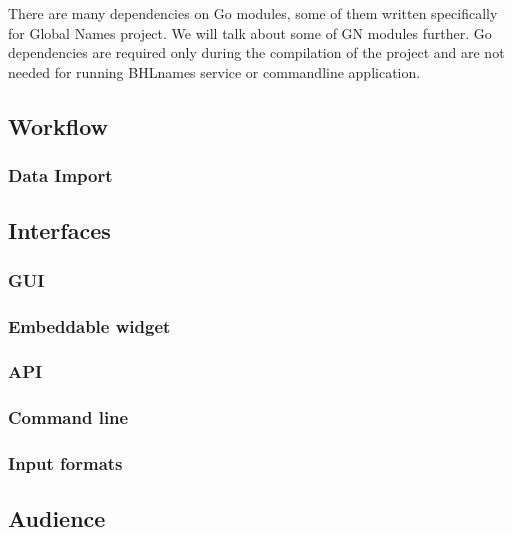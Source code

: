 \documentclass[
]{article}
\begin{document}
There are many dependencies on Go modules, some of them written
specifically for Global Names project. We will talk about some of GN
modules further. Go dependencies are required only during the
compilation of the project and are not needed for running BHLnames
service or commandline application.

\hypertarget{workflow}{%
\subsection{Workflow}\label{workflow}}

\hypertarget{data-import}{%
\subsubsection{Data Import}\label{data-import}}

\hypertarget{interfaces}{%
\subsection{Interfaces}\label{interfaces}}

\hypertarget{gui}{%
\subsubsection{GUI}\label{gui}}

\hypertarget{embeddable-widget}{%
\subsubsection{Embeddable widget}\label{embeddable-widget}}

\hypertarget{api}{%
\subsubsection{API}\label{api}}

\hypertarget{command-line}{%
\subsubsection{Command line}\label{command-line}}

\hypertarget{input-formats}{%
\subsubsection{Input formats}\label{input-formats}}

\hypertarget{audience}{%
\subsection{Audience}\label{audience}}
\end{document}
